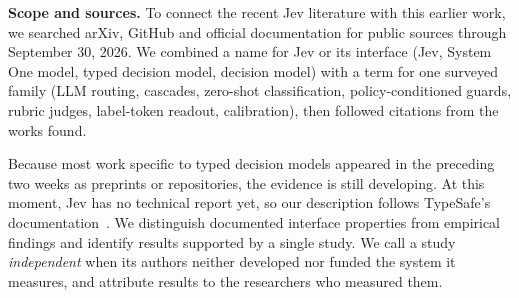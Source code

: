 \noindent\textbf{Scope and sources.} To connect the recent Jev literature with this earlier work, we searched arXiv, GitHub and official documentation for public sources through September 30, 2026. We combined a name for Jev or its interface (Jev, System One model, typed decision model, decision model) with a term for one surveyed family (LLM routing, cascades, zero-shot classification, policy-conditioned guards, rubric judges, label-token readout, calibration), then followed citations from the works found.

Because most work specific to typed decision models appeared in the preceding two weeks as preprints or repositories, the evidence is still developing. At this moment, Jev has no technical report yet, so our description follows TypeSafe's documentation~\cite{typesafe2026docs}. We distinguish documented interface properties from empirical findings and identify results supported by a single study. We call a study \emph{independent} when its authors neither developed nor funded the system it measures, and attribute results to the researchers who measured them.
